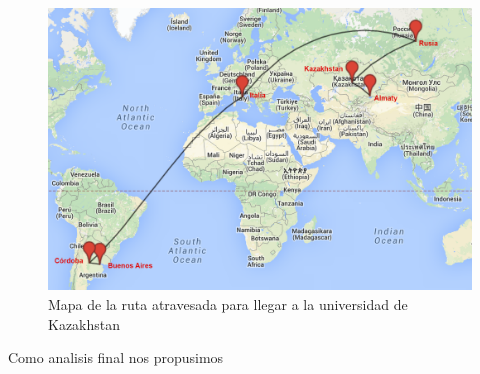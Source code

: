 \begin{figure}[H]
	\begin{center}
		  \includegraphics[scale=0.4]{../mapas/mapa_aipet.png}
		  \caption{Mapa de la ruta atravesada para llegar a la universidad de Kazakhstan}
		  \label{fig:contra1}
	\end{center}
\end{figure}

Como analisis final nos propusimos

